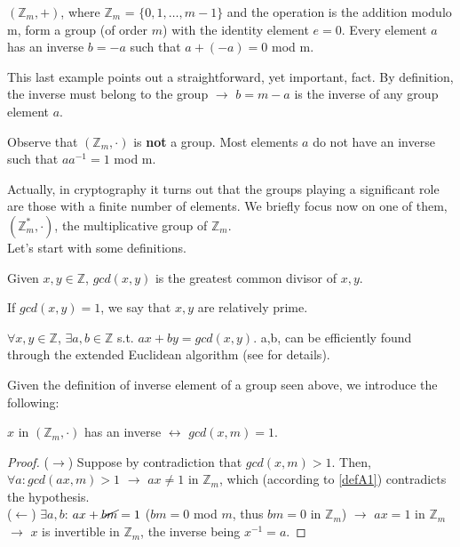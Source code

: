 \begin{myexample}
$(\mathbb{Z}_m,+)$, where $\mathbb{Z}_m$ = $\{0,1,\dots,m-1\}$ and the operation is the addition modulo m, form a group (of order $m$) with the identity element $e = 0$. Every element $a$ has an inverse $b=-a$ such that $a + (-a) = 0$ mod m.
\end{myexample}
\begin{myrem}
This last example points out a straightforward, yet important, fact. By definition, the inverse must belong to the group $\rightarrow$ $b=m-a$ is the inverse of any group element $a$.
\end{myrem}
\begin{myrem}
Observe that $(\mathbb{Z}_m,\cdot)$ is \textbf{not} a group. Most elements $a$ do not have an inverse such that $aa^{-1} = 1$ mod m.
\end{myrem}
\noindent
Actually, in cryptography it turns out that the groups playing a significant role are those with a finite number of elements. We briefly focus now on one of them, $(\mathbb{Z}_m^{*},\cdot)$, the multiplicative group of $\mathbb{Z}_m$.\\
Let's start with some definitions.
\begin{mydef}
    Given $x,y \in \mathbb{Z}$, $gcd(x,y)$ is the greatest common divisor of $x,y$.
\end{mydef}
\label{defA2}
\begin{myrem}
    If $gcd(x,y)=1$, we say that $x,y$ are relatively prime.
\end{myrem}
\begin{mylemma}
    $\forall x,y \in \mathbb{Z}$, $\exists a,b \in \mathbb{Z}$ s.t. $ax+by=gcd(x,y)$. a,b, can be efficiently found through the extended Euclidean algorithm (see \cite{UnderstandingCrypto} for details).
\end{mylemma}
\noindent
Given the definition of inverse element of a group seen above, we introduce the following:
\begin{mylemma}
    $x$ in $(\mathbb{Z}_m,\cdot)$ has an inverse $\longleftrightarrow$ $gcd(x,m)=1$. 
\end{mylemma}
\begin{proof} ($\longrightarrow$) Suppose by contradiction that $gcd(x,m)>1$. Then, $\forall a: gcd(ax,m)>1$ $\rightarrow$ $ax \neq 1$ in $\mathbb{Z}_m$, which (according to \ref{defA1}) contradicts the hypothesis.\\
($\longleftarrow$) $\exists a,b$: $ax + \cancel{bm} = 1$ ($bm = 0$ mod $m$, thus $bm=0$ in $\mathbb{Z}_m$) $\rightarrow$ $ax=1$ in $\mathbb{Z}_m$ $\rightarrow$ $x$ is invertible in $\mathbb{Z}_m$, the inverse being $x^{-1}=a$.
\end{proof}
